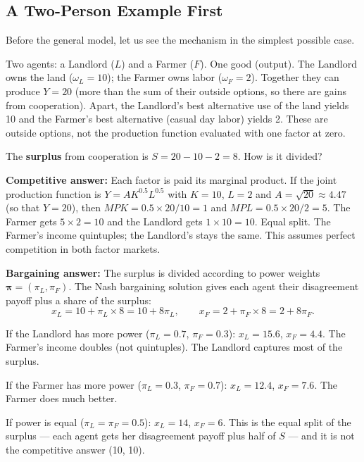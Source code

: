 \documentclass[../structural_economics_book.tex]{subfiles}
\begin{document}
\subsection{A Two-Person Example First}

Before the general model, let us see the mechanism in the simplest possible case.

\begin{example}\label{ch07:ex:landlord}
Two agents: a Landlord ($L$) and a Farmer ($F$). One good (output). The Landlord owns the land ($\omega_L = 10$); the Farmer owns labor ($\omega_F = 2$). Together they can produce $Y = 20$ (more than the sum of their outside options, so there are gains from cooperation). Apart, the Landlord's best alternative use of the land yields 10 and the Farmer's best alternative (casual day labor) yields 2. These are outside options, not the production function evaluated with one factor at zero.

The \textbf{surplus} from cooperation is $S = 20 - 10 - 2 = 8$. How is it divided?

\textbf{Competitive answer:} Each factor is paid its marginal product. If the joint production function is $Y = A K^{0.5}L^{0.5}$ with $K = 10$, $L = 2$ and $A = \sqrt{20} \approx 4.47$ (so that $Y = 20$), then $MPK = 0.5 \times 20/10 = 1$ and $MPL = 0.5 \times 20/2 = 5$. The Farmer gets $5 \times 2 = 10$ and the Landlord gets $1 \times 10 = 10$. Equal split. The Farmer's income quintuples; the Landlord's stays the same. This assumes perfect competition in both factor markets.

\textbf{Bargaining answer:} The surplus is divided according to power weights $\boldsymbol{\pi} = (\pi_L, \pi_F)$. The Nash bargaining solution gives each agent their disagreement payoff plus a share of the surplus:
\begin{equation}\label{ch07:eq:nash_two}
x_L = 10 + \pi_L \times 8 = 10 + 8\pi_L, \qquad x_F = 2 + \pi_F \times 8 = 2 + 8\pi_F.
\end{equation}

If the Landlord has more power ($\pi_L = 0.7$, $\pi_F = 0.3$): $x_L = 15.6$, $x_F = 4.4$. The Farmer's income doubles (not quintuples). The Landlord captures most of the surplus.

If the Farmer has more power ($\pi_L = 0.3$, $\pi_F = 0.7$): $x_L = 12.4$, $x_F = 7.6$. The Farmer does much better.

If power is equal ($\pi_L = \pi_F = 0.5$): $x_L = 14$, $x_F = 6$. This is the equal split of the surplus --- each agent gets her disagreement payoff plus half of $S$ --- and it is not the competitive answer (10, 10).


\end{example}
\end{document}

